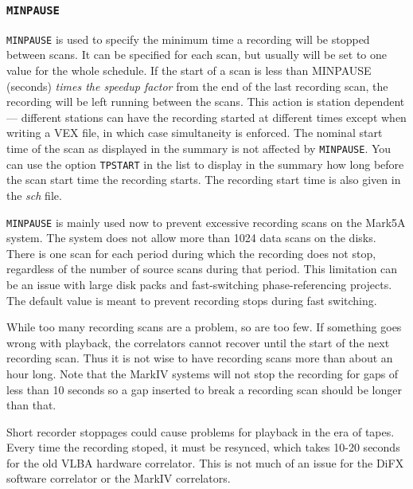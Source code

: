\documentclass{report}
\begin{document}
\subsubsection{\label{MP:MINPAUSE}{\tt MINPAUSE}}

{\tt MINPAUSE} is used to specify the minimum time a recording will be
stopped between scans.  It can be specified for each scan, but usually
will be set to one value for the whole schedule.  If the start of a
scan is less than MINPAUSE (seconds) {\sl times the speedup factor}
from the end of the last recording scan, the recording will be left
running between the scans.  This action is station dependent ---
different stations can have the recording started at different times
except when writing a VEX file, in which case simultaneity is
enforced.  The nominal start time of the scan as displayed in the
summary is not affected by {\tt MINPAUSE}.  You can use the option
{\tt TPSTART} in the  list to
display in the summary how long before the scan start time the
recording starts.  The recording start time is also given in the {\sl
sch} file.

{\tt MINPAUSE} is mainly used now to prevent excessive recording scans
on the Mark5A system.  The system does not allow more than 1024
data scans on the disks.  There is one scan for each period during which
the recording does not stop, regardless of the number of source scans
during that period.  This limitation can be an issue with large disk
packs and fast-switching phase-referencing projects.  The default
value is meant to prevent recording stops during fast switching.

While too many recording scans are a problem, so are too few.  If
something goes wrong with playback, the correlators cannot recover
until the start of the next recording scan.  Thus it is not wise to
have recording scans more than about an hour long.  Note that the MarkIV
systems will not stop the recording for gaps of less than 10 seconds
so a gap inserted to break a recording scan should be longer than
that.

Short recorder stoppages could cause problems for playback in the era
of tapes.  Every time the recording stoped, it must be resynced, which
takes 10-20 seconds for the old VLBA hardware correlator.  This is not
much of an issue for the DiFX software correlator or the MarkIV
correlators.
\end{document}
